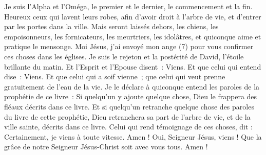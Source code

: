 \begin{multicols}{2}
Je suis l'Alpha et l'Oméga, le premier et le dernier, le commencement et la fin.
Heureux ceux qui lavent leurs robes, afin d’avoir droit à l’arbre de vie, et d’entrer par les portes dans la ville.
Mais seront laissés dehors, les chiens, les empoisonneurs, les fornicateurs, les meurtriers, les idolâtres, et quiconque aime et pratique le mensonge.
Moi Jésus, j'ai envoyé mon ange (7) pour vous confirmer ces choses dans les églises. Je suis le rejeton et la postérité de David, l'étoile brillante du matin.
Et l'Esprit et l'Epouse disent : Viens. Et que celui qui entend dise : Viens. Et que celui qui a soif vienne ; que celui qui veut prenne gratuitement de l'eau de la vie.
Je le déclare à quiconque entend les paroles de la prophétie de ce livre : Si quelqu'un y ajoute quelque chose, Dieu le frappera des fléaux décrits dans ce livre.
Et si quelqu'un retranche quelque chose des paroles du livre de cette prophétie, Dieu retranchera sa part de l’arbre de vie, et de la ville sainte, décrits dans ce livre.
Celui qui rend témoignage de ces choses, dit : Certainement, je viens à toute vitesse. Amen ! Oui, Seigneur Jésus, viens !
Que la grâce de notre Seigneur Jésus-Christ soit avec vous tous. Amen !
\PPE{}
\end{multicols}

